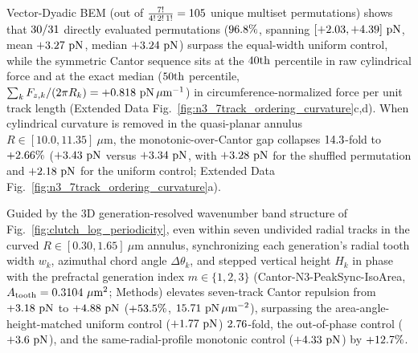 \documentclass[pdflatex,sn-nature]{sn-jnl}
\DeclareRobustCommand{\roundzero}[1]{\fpeval{round(#1,0)}}
\DeclareRobustCommand{\roundone}[1]{\fpeval{round(#1,1)}}
\DeclareRobustCommand{\roundtwo}[1]{\fpeval{round(#1,2)}}
\DeclareRobustCommand{\roundthree}[1]{\fpeval{round(#1,3)}}
\DeclareRobustCommand{\roundfour}[1]{\fpeval{round(#1,4)}}
\begin{document}
Vector-Dyadic BEM (out of $\frac{7!}{4!\,2!\,1!} = \roundzero{\NthreePermNUniqueMultiset}$ unique multiset permutations) shows that $\roundzero{\NthreePermNEvalGtUni}/\roundzero{\NthreePermNTotalEvaluated}$ directly evaluated permutations ($\roundone{\NthreePermPctEvalGtUni}\%$, spanning $[+\roundtwo{\NthreePermFzMinPn}, +\roundtwo{\NthreePermFzMaxPn}]\text{ pN}$, mean $+\roundtwo{\NthreePermFzMeanPn}\text{ pN}$, median $+\roundtwo{\NthreePermFzMedianPn}\text{ pN}$) surpass the equal-width uniform control, while the symmetric Cantor sequence sits at the $\roundzero{\NthreePermCantorPctFzEval}\text{th}$ percentile in raw cylindrical force and at the exact median ($\roundzero{\NthreePermCantorPctFcircEval}\text{th}$ percentile, $\sum_k F_{z,k}/(2\pi R_k) = +\roundthree{\NthreeCurvCylCantorFcircPnPerUm}\text{ pN}\,\mu\text{m}^{-1}$) in circumference-normalized force per unit track length (Extended Data Fig.~\ref{fig:n3_7track_ordering_curvature}c,d). When cylindrical curvature is removed in the quasi-planar annulus $R \in [10.0, 11.35]\ \mu\text{m}$, the monotonic-over-Cantor gap collapses $\roundone{\NthreeCurvGapReductionFactor}$-fold to $+\roundtwo{\NthreeCurvQparcMonoVsCantorPct}\%$ ($+\roundtwo{\NthreeCurvQparcMonotonicFzPn}\text{ pN}$ versus $+\roundtwo{\NthreeCurvQparcCantorFzPn}\text{ pN}$, with $+\roundtwo{\NthreeCurvQparcShuffledFzPn}\text{ pN}$ for the shuffled permutation and $+\roundtwo{\NthreeCurvQparcUniformFzPn}\text{ pN}$ for the uniform control; Extended Data Fig.~\ref{fig:n3_7track_ordering_curvature}a).

Guided by the 3D generation-resolved wavenumber band structure of Fig.~\ref{fig:clutch_log_periodicity}, even within seven undivided radial tracks in the curved $R \in [0.30, 1.65]\ \mu\text{m}$ annulus, synchronizing each generation's radial tooth width $w_k$, azimuthal chord angle $\Delta\theta_k$, and stepped vertical height $H_k$ in phase with the prefractal generation index $m \in \{1,2,3\}$ (Cantor-N3-PeakSync-IsoArea, $A_{\rm tooth} = \roundfour{\NthreeUnithreedFzerozerozeroAreaUmtwo}\ \mu\text{m}^2$; Methods) elevates seven-track Cantor repulsion from $+\roundtwo{\NthreePeaksyncCantorFlatzFzPn}\text{ pN}$ to $+\roundtwo{\NthreePeaksyncCantorIsoareaFzPn}\text{ pN}$ ($+\roundone{\NthreePeaksyncGainIsoVsFlatzPct}\%$, $\roundtwo{\NthreePeaksyncCantorIsoareaFa}\text{ pN}\,\mu\text{m}^{-2}$), surpassing the area-angle-height-matched uniform control ($+\roundtwo{\NthreePeaksyncCtrlUniAahFzPn}\text{ pN}$) $\roundtwo{\NthreePeaksyncRatioIsoVsUniAah}$-fold, the out-of-phase control ($+\roundtwo{\NthreePeaksyncCtrlOutofphaseAahFzPn}\text{ pN}$), and the same-radial-profile monotonic control ($+\roundtwo{\NthreePeaksyncCtrlMonoSameradFzPn}\text{ pN}$) by $+\roundone{\NthreePeaksyncGainIsoVsMonoSameradPct}\%$.
\end{document}
